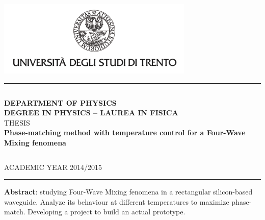 \documentclass[11pt,a4paper]{article}
\begin{document}
\begin{titlepage}
\begin{center}

\includegraphics[width=0.7\textwidth]{unitn_logo.png}~\\[1.2cm]

\hrule
$$$$
$$$$

\textsc{\LARGE \textbf{DEPARTMENT OF PHYSICS}}\\[0.5cm]
\textsc{\LARGE \textbf{DEGREE IN PHYSICS – LAUREA IN FISICA}}\\[2.5cm]
\textsc{\Large THESIS}\\[1.3cm]

{ \huge \bfseries Phase-matching method with temperature control for a Four-Wave Mixing fenomena}\\[3.0cm]

\begin{parcolumns}{2}
\end{parcolumns}
$$$$
$$$$
$$$$
$$$$
$$$$
$$$$
$$$$
$$$$

\large ACADEMIC YEAR 2014/2015
\hrule
\vfill
\textbf{Abstract}: studying Four-Wave Mixing fenomena in a rectangular silicon-based waveguide. Analyze its behaviour at different temperatures to maximize phase-match. Developing a project to build an actual prototype.

\vfill

{\large}

\end{center}
\end{titlepage}
\end{document}

